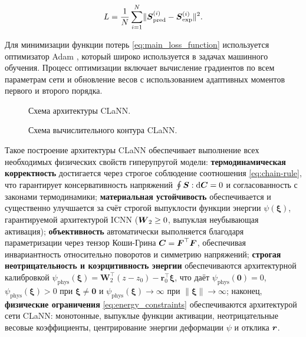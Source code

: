 \begin{equation}
 L = \frac{1}{N}\sum_{i=1}^N \lVert \boldsymbol{S}^{(i)}_{\text{pred}} - \boldsymbol{S}^{(i)}_{\text{exp}} \rVert^2.
\label{eq:main_loss_function}
\end{equation}

Для минимизации функции потерь \eqref{eq:main_loss_function} используется оптимизатор Adam \cite{kingma2014adam}, 
который широко используется в задачах машинного обучения. 
Процесс оптимизации включает вычисление градиентов по всем параметрам сети и обновление весов 
с использованием адаптивных моментов первого и второго порядка.

\begin{figure}[H]
  \centering
  \resizebox{\textwidth}{!}{}
  \caption{Схема архитектуры CLaNN.}
  \label{fig:clann_arc}
  \label{fig:clann_icnn1_nn}
\end{figure}


\begin{figure}[H]
  \centering
  \resizebox{\textwidth}{!}{}
  \caption{Схема вычислительного контура CLaNN.}
  \label{fig:clann_pipeline}
\end{figure}

Такое построение архитектуры CLaNN обеспечивает выполнение всех необходимых физических свойств гиперупругой модели: 
\textbf{термодинамическая корректность} достигается через строгое соблюдение соотношения \eqref{eq:chain-rule}, 
что гарантирует консервативность напряжений $\oint \boldsymbol{S}:\mathrm{d}\boldsymbol{C} = 0$ и согласованность с законами 
термодинамики; 
\textbf{материальная устойчивость} обеспечивается и существенно улучшается за счёт строгой выпуклости функции энергии 
$\psi(\boldsymbol{\xi})$, гарантируемой архитектурой ICNN ($\boldsymbol{W}_2 \ge 0$, выпуклая неубывающая активация); 
\textbf{объективность} автоматически выполняется благодаря параметризации через тензор 
Коши-Грина $\boldsymbol{C} = \boldsymbol{F}^{\top}\boldsymbol{F}$, обеспечивая инвариантность относительно поворотов и симметрию напряжений; 
\textbf{строгая неотрицательность и коэрцитивность энергии} обеспечиваются архитектурной калибровкой 
$\psi_{\mathrm{phys}}(\boldsymbol{\xi}) = \mathbf{W}_2^{\top}(z - z_0) - \mathbf{r}_0^{\top}\boldsymbol{\xi}$,
что даёт $\psi_{\mathrm{phys}}(\mathbf{0})=0$, $\psi_{\mathrm{phys}}(\boldsymbol{\xi})>0$ при $\boldsymbol{\xi}\ne\mathbf{0}$ и 
$\psi_{\mathrm{phys}}(\boldsymbol{\xi})\to\infty$ при $\|\boldsymbol{\xi}\|\to\infty$; 
наконец, \textbf{физические ограничения} \eqref{eq:energy_constraints} обеспечиваются архитектурой сети CLaNN: монотонные, выпуклые функции активации,
неотрицательные весовые коэффициенты, центрирование энергии деформации $\psi$ и отклика $\boldsymbol{r}$.



